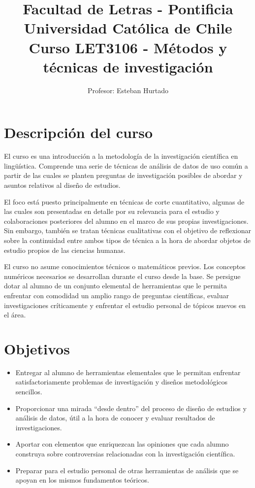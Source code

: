 \documentclass[letterpaper,11pt]{article}
\title{{\Large Facultad de Letras - Pontificia Universidad Católica de Chile } \\ Curso LET3106 - Métodos y técnicas de investigación}
\author{Profesor: Esteban Hurtado}
\begin{document}
\maketitle

\section{Descripción del curso}

El curso es una introducción a la metodología de la investigación científica en lingüística. Comprende una serie de técnicas de análisis de datos de uso común a partir de las cuales se planten preguntas de investigación posibles de abordar y asuntos relativos al diseño de estudios.

El foco está puesto principalmente en técnicas de corte cuantitativo, algunas de las cuales son presentadas en detalle por su relevancia para el estudio y colaboraciones posteriores del alumno en el marco de sus propias investigaciones. Sin embargo, también se tratan técnicas cualitativas con el objetivo de reflexionar sobre la continuidad entre ambos tipos de técnica a la hora de abordar objetos de estudio propios de las ciencias humanas.

El curso no asume conocimientos técnicos o matemáticos previos. Los conceptos numéricos necesarios se desarrollan durante el curso desde la base. Se persigue dotar al alumno de un conjunto elemental de herramientas que le permita enfrentar con comodidad un amplio rango de preguntas científicas, evaluar investigaciones críticamente y enfrentar el estudio personal de tópicos nuevos en el área.

\section{Objetivos}

\begin{itemize}
  \item Entregar al alumno de herramientas elementales que le permitan enfrentar satisfactoriamente problemas de investigación y diseños metodológicos sencillos.
    
  \item Proporcionar una mirada ``desde dentro'' del proceso de diseño de estudios y análisis de datos, útil a la hora de conocer y evaluar resultados de investigaciones.

  \item Aportar con elementos que enriquezcan las opiniones que cada alumno construya sobre controversias relacionadas con la investigación científica.
  
  \item Preparar para el estudio personal de otras herramientas de análisis que se apoyan en los mismos fundamentos teóricos.
  
\end{itemize}
\end{document}
